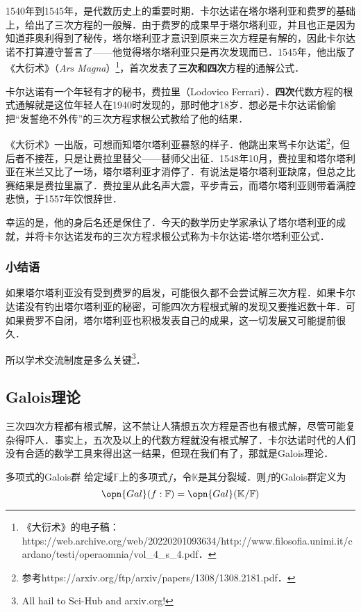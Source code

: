 1540年到1545年，是代数历史上的重要时期．卡尔达诺在塔尔塔利亚和费罗的基础上，给出了三次方程的一般解．由于费罗的成果早于塔尔塔利亚，并且也正是因为知道菲奥利得到了秘传，塔尔塔利亚才意识到原来三次方程是有解的，因此卡尔达诺不打算遵守誓言了——他觉得塔尔塔利亚只是再次发现而已．1545年，他出版了《大衍术》（\textsl{Ars Magna}）\footnote{《大衍术》的电子稿：https://web.archive.org/web/20220201093634/http://www.filosofia.unimi.it/cardano/testi/operaomnia/vol_4_s_4.pdf．}，首次发表了\textbf{三次和四次}方程的通解公式．

卡尔达诺有一个年轻有才的秘书，费拉里（Lodovico Ferrari）．\textbf{四次}代数方程的根式通解就是这位年轻人在1940时发现的，那时他才18岁．想必是卡尔达诺偷偷把“发誓绝不外传”的三次方程求根公式教给了他的结果．

《大衍术》一出版，可想而知塔尔塔利亚暴怒的样子．他跳出来骂卡尔达诺\footnote{参考https://arxiv.org/ftp/arxiv/papers/1308/1308.2181.pdf．}，但后者不接茬，只是让费拉里替父——替师父出征．1548年10月，费拉里和塔尔塔利亚在米兰又比了一场，塔尔塔利亚才消停了．有说法是塔尔塔利亚缺席，但总之比赛结果是费拉里赢了．费拉里从此名声大震，平步青云，而塔尔塔利亚则带着满腔悲愤，于1557年饮恨辞世．

幸运的是，他的身后名还是保住了．今天的数学历史学家承认了塔尔塔利亚的成就，并将卡尔达诺发布的三次方程求根公式称为卡尔达诺-塔尔塔利亚公式．

\subsubsection{小结语}

如果塔尔塔利亚没有受到费罗的启发，可能很久都不会尝试解三次方程．如果卡尔达诺没有钓出塔尔塔利亚的秘密，可能四次方程根式解的发现又要推迟数十年．可如果费罗不自闭，塔尔塔利亚也积极发表自己的成果，这一切发展又可能提前很久．

所以学术交流制度是多么关键\footnote{All hail to Sci-Hub and arxiv.org! }．



\subsection{Galois理论}\label{PlyRtS_sub1}

三次四次方程都有根式解，这不禁让人猜想五次方程是否也有根式解，尽管可能复杂得吓人．事实上，五次及以上的代数方程就没有根式解了．卡尔达诺时代的人们没有合适的数学工具来得出这一结果，但现在我们有了，那就是Galois理论．

\begin{definition}{多项式的Galois群}
给定域$\mathbb{F}$上的多项式$f$，令$\mathbb{K}$是其分裂域．则$f$的Galois群定义为
\begin{equation}
\opn{Gal}(f:\mathbb{F})=\opn{Gal}(\mathbb{K}/\mathbb{F})
\end{equation}
\end{definition}


